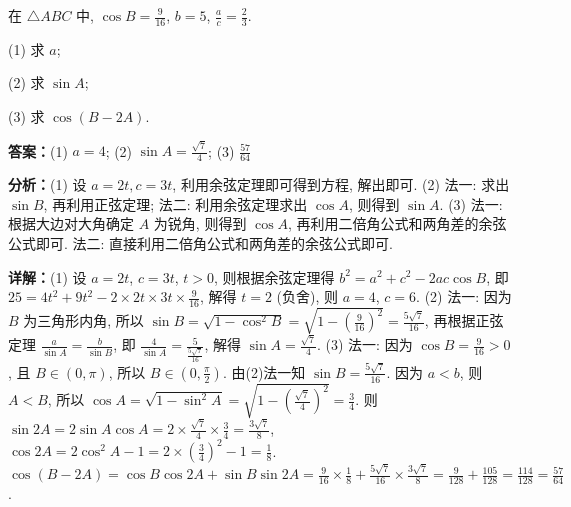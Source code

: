 \begin{question}[points=14]
在 $\triangle ABC$ 中, $\cos B = \frac{9}{16}$, $b=5$, $\frac{a}{c}=\frac{2}{3}$.

(1) 求 $a$;

(2) 求 $\sin A$;

(3) 求 $\cos(B-2A)$.
\begin{solution}
\textbf{答案：}(1) $a=4$; (2) $\sin A = \frac{\sqrt{7}}{4}$; (3) $\frac{57}{64}$

\textbf{分析：}(1) 设 $a=2t,c=3t$, 利用余弦定理即可得到方程, 解出即可. (2) 法一: 求出 $\sin B$, 再利用正弦定理; 法二: 利用余弦定理求出 $\cos A$, 则得到 $\sin A$. (3) 法一: 根据大边对大角确定 $A$ 为锐角, 则得到 $\cos A$, 再利用二倍角公式和两角差的余弦公式即可. 法二: 直接利用二倍角公式和两角差的余弦公式即可.

\textbf{详解：}(1) 设 $a=2t$, $c=3t$, $t>0$, 则根据余弦定理得 $b^2=a^2+c^2-2ac\cos B$, 即 $25=4t^2+9t^2-2\times2t\times3t\times\frac{9}{16}$, 解得 $t=2$ (负舍), 则 $a=4$, $c=6$.
(2) 法一: 因为 $B$ 为三角形内角, 所以 $\sin B = \sqrt{1-\cos^2 B} = \sqrt{1-\left(\frac{9}{16}\right)^2} = \frac{5\sqrt{7}}{16}$, 再根据正弦定理 $\frac{a}{\sin A}=\frac{b}{\sin B}$, 即 $\frac{4}{\sin A}=\frac{5}{\frac{5\sqrt{7}}{16}}$, 解得 $\sin A = \frac{\sqrt{7}}{4}$.
(3) 法一: 因为 $\cos B=\frac{9}{16}>0$, 且 $B\in(0,\pi)$, 所以 $B\in(0,\frac{\pi}{2})$. 由(2)法一知 $\sin B=\frac{5\sqrt{7}}{16}$. 因为 $a<b$, 则 $A<B$, 所以 $\cos A=\sqrt{1-\sin^2 A}=\sqrt{1-\left(\frac{\sqrt{7}}{4}\right)^2}=\frac{3}{4}$. 则 $\sin2A=2\sin A\cos A=2\times\frac{\sqrt{7}}{4}\times\frac{3}{4}=\frac{3\sqrt{7}}{8}$, $\cos2A=2\cos^2 A-1=2\times\left(\frac{3}{4}\right)^2-1=\frac{1}{8}$. $\cos(B-2A)=\cos B\cos2A+\sin B\sin2A=\frac{9}{16}\times\frac{1}{8}+\frac{5\sqrt{7}}{16}\times\frac{3\sqrt{7}}{8}=\frac{9}{128}+\frac{105}{128}=\frac{114}{128}=\frac{57}{64}$.
\end{solution}
\end{question}

